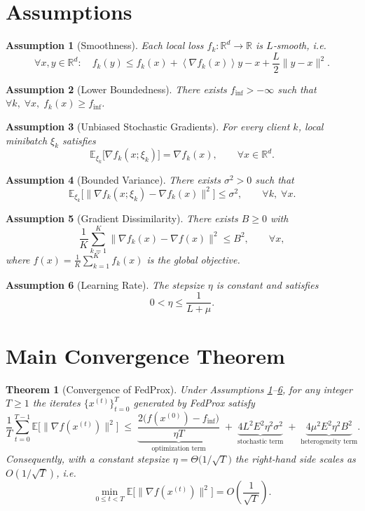 \documentclass[11pt]{article}
\newtheorem{theorem}{Theorem}
\newtheorem{assumption}{Assumption}
\newcommand{\E}{\mathbb{E}}
\newcommand{\R}{\mathbb{R}}
\newcommand{\inner}[1]{\left\langle #1 \right\rangle}
\begin{document}
\newpage

\section*{Assumptions}
\begin{assumption}[Smoothness]\label{ass:smooth}
Each local loss $f_k:\R^{d}\!\to\R$ is $L$‑smooth, i.e.
\[
\forall x,y\in\R^{d}:\quad f_k(y)\le f_k(x)+\inner{\nabla f_k(x)}{y-x}+\frac{L}{2}\|y-x\|^{2}.
\]
\end{assumption}

\begin{assumption}[Lower Boundedness]\label{ass:lb}
There exists $f_{\inf}>-\infty$ such that $\forall k,\; \forall x,\; f_k(x)\ge f_{\inf}$.
\end{assumption}

\begin{assumption}[Unbiased Stochastic Gradients]\label{ass:unbiased}
For every client $k$, local minibatch $\xi_k$ satisfies
\[
\E_{\xi_k}\bigl[\nabla f_k(x;\xi_k)\bigr]=\nabla f_k(x),\qquad\forall x\in\R^{d}.
\]
\end{assumption}

\begin{assumption}[Bounded Variance]\label{ass:var}
There exists $\sigma^{2}>0$ such that
\[
\E_{\xi_k}\bigl[\|\nabla f_k(x;\xi_k)-\nabla f_k(x)\|^{2}\bigr]\le\sigma^{2},\qquad\forall k,\;\forall x.
\]
\end{assumption}

\begin{assumption}[Gradient Dissimilarity]\label{ass:dissim}
There exists $B\ge0$ with
\[
\frac{1}{K}\sum_{k=1}^{K}\|\nabla f_k(x)-\nabla f(x)\|^{2}\le B^{2},\qquad\forall x,
\]
where $f(x)=\frac{1}{K}\sum_{k=1}^{K}f_k(x)$ is the global objective.
\end{assumption}

\begin{assumption}[Learning Rate]\label{ass:lr}
The stepsize $\eta$ is constant and satisfies
\[
0<\eta\le \frac{1}{L+\mu}.
\]
\end{assumption}

\section*{Main Convergence Theorem}
\begin{theorem}[Convergence of FedProx]\label{thm:main}
Under Assumptions \ref{ass:smooth}–\ref{ass:lr}, for any integer $T\ge 1$ the iterates $\{x^{(t)}\}_{t=0}^{T}$ generated by FedProx satisfy
\[
\frac{1}{T}\sum_{t=0}^{T-1}\E\bigl[\|\nabla f(x^{(t)})\|^{2}\bigr]\;\le\;
\underbrace{\frac{2\bigl(f(x^{(0)})-f_{\inf}\bigr)}{\eta T}}_{\text{optimization term}}
\;+\;
\underbrace{4L^{2}E^{2}\eta^{2}\sigma^{2}}_{\text{stochastic term}}
\;+\;
\underbrace{4\mu^{2}E^{2}\eta^{2}B^{2}}_{\text{heterogeneity term}} .
\]
Consequently, with a constant stepsize $\eta = \Theta\!\bigl(1/\sqrt{T}\bigr)$ the right‑hand side scales as $O(1/\sqrt{T})$, i.e.
\[
\min_{0\le t<T}\E\bigl[\|\nabla f(x^{(t)})\|^{2}\bigr]=O\!\left(\frac{1}{\sqrt{T}}\right).
\]
\end{theorem}
\end{document}

